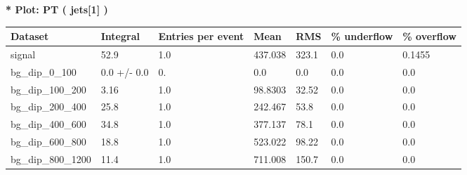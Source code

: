 \documentclass[a4paper, 10pt]{article}
\begin{document}
\textbf{* Plot: PT ( jets[1] ) }\\
   \begin{table}[H]
  \begin{center}
    \begin{tabular}{|m{23.0mm}|m{23.0mm}|m{18.0mm}|m{19.0mm}|m{19.0mm}|m{19.0mm}|m{19.0mm}|}
      \hline
      {\cellcolor{yellow}         Dataset}& {\cellcolor{yellow}         Integral}& {\cellcolor{yellow}         Entries per event}& {\cellcolor{yellow}         Mean}& {\cellcolor{yellow}         RMS}& {\cellcolor{yellow}         \% underflow}& {\cellcolor{yellow}         \% overflow}\\
      \hline
      {\cellcolor{white}         signal}& {\cellcolor{white}         52.9}& {\cellcolor{white}         1.0}& {\cellcolor{white}         437.038}& {\cellcolor{white}         323.1}& {\cellcolor{green}         0.0}& {\cellcolor{green}         0.1455}\\
      \hline
      {\cellcolor{white}         bg\_dip\_0\_100}& {\cellcolor{white}         0.0 +/\-- 0.0}& {\cellcolor{white}         0.}& {\cellcolor{white}         0.0}& {\cellcolor{white}         0.0}& {\cellcolor{green}         0.0}& {\cellcolor{green}         0.0}\\
      \hline
      {\cellcolor{white}         bg\_dip\_100\_200}& {\cellcolor{white}         3.16}& {\cellcolor{white}         1.0}& {\cellcolor{white}         98.8303}& {\cellcolor{white}         32.52}& {\cellcolor{green}         0.0}& {\cellcolor{green}         0.0}\\
      \hline
      {\cellcolor{white}         bg\_dip\_200\_400}& {\cellcolor{white}         25.8}& {\cellcolor{white}         1.0}& {\cellcolor{white}         242.467}& {\cellcolor{white}         53.8}& {\cellcolor{green}         0.0}& {\cellcolor{green}         0.0}\\
      \hline
      {\cellcolor{white}         bg\_dip\_400\_600}& {\cellcolor{white}         34.8}& {\cellcolor{white}         1.0}& {\cellcolor{white}         377.137}& {\cellcolor{white}         78.1}& {\cellcolor{green}         0.0}& {\cellcolor{green}         0.0}\\
      \hline
      {\cellcolor{white}         bg\_dip\_600\_800}& {\cellcolor{white}         18.8}& {\cellcolor{white}         1.0}& {\cellcolor{white}         523.022}& {\cellcolor{white}         98.22}& {\cellcolor{green}         0.0}& {\cellcolor{green}         0.0}\\
      \hline
      {\cellcolor{white}         bg\_dip\_800\_1200}& {\cellcolor{white}         11.4}& {\cellcolor{white}         1.0}& {\cellcolor{white}         711.008}& {\cellcolor{white}         150.7}& {\cellcolor{green}         0.0}& {\cellcolor{green}         0.0}\\

\end{tabular}
\end{center}
\end{table}
\end{document}
